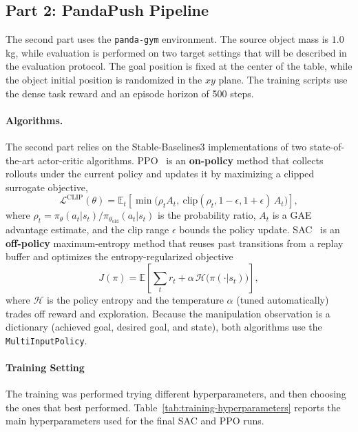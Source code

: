 \subsection{Part 2: PandaPush Pipeline}
The second part uses the \texttt{panda-gym} environment. The source object mass is $1.0$ kg, while evaluation is performed on two target settings that will be described in the evaluation protocol. The goal position is fixed at the center of the table, while the object initial position is randomized in the $xy$ plane. The training scripts use the dense task reward and an episode horizon of 500 steps.

\paragraph{Algorithms.}
The second part relies on the Stable-Baselines3 implementations of two state-of-the-art actor-critic algorithms. PPO~\cite{schulman2017ppo} is an \textbf{on-policy} method that collects rollouts under the current policy and updates it by maximizing a clipped surrogate objective,
\begin{equation}
\mathcal{L}^{\mathrm{CLIP}}(\theta) = \mathbb{E}_t\!\left[\min\!\big(\rho_t A_t,\ \mathrm{clip}(\rho_t, 1-\epsilon, 1+\epsilon)\, A_t\big)\right],
\end{equation}
where $\rho_t = \pi_\theta(a_t|s_t)/\pi_{\theta_{\mathrm{old}}}(a_t|s_t)$ is the probability ratio, $A_t$ is a GAE advantage estimate, and the clip range $\epsilon$ bounds the policy update. SAC~\cite{haarnoja2018sac} is an \textbf{off-policy} maximum-entropy method that reuses past transitions from a replay buffer and optimizes the entropy-regularized objective
\begin{equation}
J(\pi) = \mathbb{E}\!\left[\sum_t r_t + \alpha\, \mathcal{H}\big(\pi(\cdot|s_t)\big)\right],
\end{equation}
where $\mathcal{H}$ is the policy entropy and the temperature $\alpha$ (tuned automatically) trades off reward and exploration. Because the manipulation observation is a dictionary (achieved goal, desired goal, and state), both algorithms use the \texttt{MultiInputPolicy}.

\paragraph{Training Setting}

The training was performed trying different hyperparameters, and then choosing 
the ones that best performed. Table~\ref{tab:training-hyperparameters} reports the main hyperparameters used for the final SAC and PPO runs.

